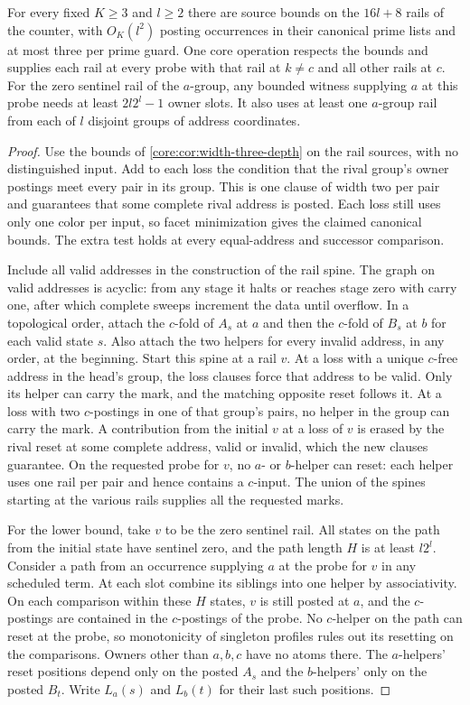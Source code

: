 \begin{theorem}\label{core:thm:rail-transition-depth}
For every fixed $K\ge3$ and $l\ge2$ there are source bounds on the
$16l+8$ rails of the counter, with $O_K(l^2)$ posting occurrences in
their canonical prime lists and at most three per prime guard.
One core operation respects the bounds and supplies each rail at
every probe with that rail at $k\ne c$ and all other rails at $c$.
For the zero sentinel rail of the $a$-group, any bounded witness
supplying $a$ at this probe needs at least $2l2^l-1$ owner slots.
It also uses at least one $a$-group rail from each of $l$
disjoint groups of address coordinates.
\end{theorem}
\begin{proof}
Use the bounds of \cref{core:cor:width-three-depth} on the rail
sources, with no distinguished input. Add to each loss the condition
that the rival group's owner postings meet every pair in its group.
This is one clause of width two per pair and guarantees that some
complete rival address is posted. Each loss still uses only one color
per input, so facet minimization gives the claimed canonical bounds.
The extra test holds at every equal-address and successor comparison.

Include all valid addresses in the construction of the rail spine.
The graph on valid addresses is acyclic: from any stage it halts or
reaches stage zero with carry one, after which complete sweeps
increment the data until overflow. In a topological order, attach
the $c$-fold of $A_s$ at $a$ and then the $c$-fold of $B_s$ at $b$
for each valid state $s$. Also attach the two helpers for every
invalid address, in any order, at the beginning. Start this spine
at a rail $v$.
At a loss with a unique $c$-free address in the head's group, the
loss clauses force that address to be valid. Only its helper can
carry the mark, and the matching opposite reset follows it. At a
loss with two $c$-postings in one of that group's pairs, no helper
in the group can carry the mark. A contribution from the initial
$v$ at a loss of $v$ is erased by the rival reset at some complete
address, valid or invalid, which the new clauses guarantee.
On the requested probe for $v$, no $a$- or
$b$-helper can reset: each helper uses one rail per pair and hence
contains a $c$-input. The union of the spines starting at the
various rails supplies all the requested marks.

For the lower bound, take $v$ to be the zero sentinel rail.
All states on the path from the initial state have sentinel
zero, and the path length $H$ is at least $l2^l$. Consider a path from an occurrence supplying $a$ at the probe
for $v$ in any scheduled term. At each slot combine its siblings
into one helper by associativity. On each comparison within these
$H$ states, $v$ is still posted at $a$, and the $c$-postings are
contained in the $c$-postings of the probe. No $c$-helper on the
path can reset at the probe, so monotonicity of singleton profiles
rules out its resetting on the comparisons. Owners other than
$a,b,c$ have no atoms there. The $a$-helpers' reset positions depend
only on the posted $A_s$ and the $b$-helpers' only on the posted
$B_t$. Write $L_a(s)$ and $L_b(t)$ for their last such positions.


\end{proof}
